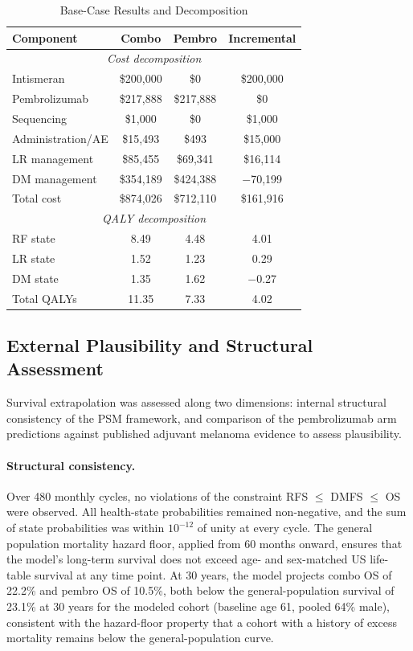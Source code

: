 \documentclass[12pt,a4paper]{article}
\begin{document}
\begin{table}[H]
\centering
\caption{Base-Case Results and Decomposition}
\label{tab:base}
\begin{tabular}{lccc}
\toprule
\textbf{Component} & \textbf{Combo} & \textbf{Pembro} & \textbf{Incremental} \\
\midrule
\multicolumn{4}{c}{\textit{Cost decomposition}} \\
Intismeran   & \$200,000   & \$0        & \$200,000 \\
Pembrolizumab & \$217,888  & \$217,888  & \$0 \\
Sequencing   & \$1,000     & \$0        & \$1,000 \\
Administration/AE & \$15,493 & \$493    & \$15,000 \\
LR management & \$85,455  & \$69,341   & \$16,114 \\
DM management & \$354,189  & \$424,388  & $-$70,199 \\
\midrule
Total cost    & \$874,026 & \$712,110  & \$161,916 \\
\midrule
\multicolumn{4}{c}{\textit{QALY decomposition}} \\
RF state      & 8.49       & 4.48       & 4.01 \\
LR state      & 1.52       & 1.23       & 0.29 \\
DM state      & 1.35       & 1.62       & $-$0.27 \\
\midrule
Total QALYs   & 11.35      & 7.33       & 4.02 \\
\bottomrule
\end{tabular}
\end{table}

\subsection{External Plausibility and Structural Assessment}

Survival extrapolation was assessed along two dimensions: internal structural consistency of the PSM framework, and comparison of the \mbox{pembrolizumab} arm predictions against published adjuvant melanoma evidence to assess plausibility.

\paragraph{Structural consistency.} Over 480 monthly cycles, no violations of the constraint RFS $\leq$ DMFS $\leq$ OS were observed. All health-state probabilities remained non-negative, and the sum of state probabilities was within $10^{-12}$ of unity at every cycle. The general population mortality hazard floor, applied from 60 months onward, ensures that the model's long-term survival does not exceed age- and sex-matched US life-table survival at any time point. At 30 years, the model projects combo OS of 22.2\% and pembro OS of 10.5\%, both below the general-population survival of 23.1\% at 30 years for the modeled cohort (baseline age 61, pooled 64\% male), consistent with the hazard-floor property that a cohort with a history of excess mortality remains below the general-population curve.
\end{document}
